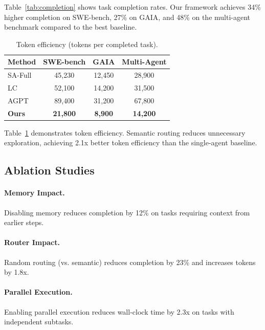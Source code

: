 Table~\ref{tab:completion} shows task completion rates. Our framework achieves 34\% higher completion on SWE-bench, 27\% on GAIA, and 48\% on the multi-agent benchmark compared to the best baseline.

\begin{table}[h]
\centering
\caption{Token efficiency (tokens per completed task).}
\label{tab:tokens}
\begin{tabular}{lccc}
\toprule
\textbf{Method} & \textbf{SWE-bench} & \textbf{GAIA} & \textbf{Multi-Agent} \\
\midrule
SA-Full & 45,230 & 12,450 & 28,900 \\
LC & 52,100 & 14,200 & 31,500 \\
AGPT & 89,400 & 31,200 & 67,800 \\
\midrule
\textbf{Ours} & \textbf{21,800} & \textbf{8,900} & \textbf{14,200} \\
\bottomrule
\end{tabular}
\end{table}

Table~\ref{tab:tokens} demonstrates token efficiency. Semantic routing reduces unnecessary exploration, achieving 2.1x better token efficiency than the single-agent baseline.

\subsection{Ablation Studies}

\paragraph{Memory Impact.} Disabling memory reduces completion by 12\% on tasks requiring context from earlier steps.

\paragraph{Router Impact.} Random routing (vs. semantic) reduces completion by 23\% and increases tokens by 1.8x.

\paragraph{Parallel Execution.} Enabling parallel execution reduces wall-clock time by 2.3x on tasks with independent subtasks.

